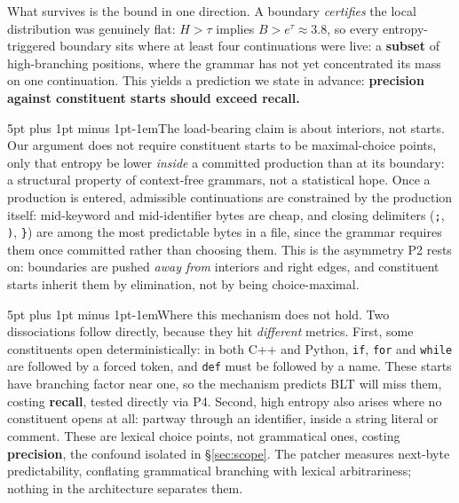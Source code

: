 \documentclass[9pt]{extarticle}
\makeatletter
\renewcommand\paragraph{\@startsection{paragraph}{4}{0pt}%
  {5pt plus 1pt minus 1pt}{-1em}{\normalfont\normalsize\bfseries}}
\newcommand{\code}[1]{\texttt{\small #1}}
\makeatother
\begin{document}
What survives is the bound in one direction. A boundary \emph{certifies} the
local distribution was genuinely flat: $H > \tau$ implies $B > e^{\tau} \approx
3.8$, so every entropy-triggered boundary sits where at least four
continuations were live: a \textbf{subset} of high-branching positions,
where the grammar has not yet concentrated its mass on one continuation. This
yields a prediction we state in advance: \textbf{precision against constituent
starts should exceed recall.}

\paragraph{The load-bearing claim is about interiors, not starts.}
Our argument does not require constituent starts to be maximal-choice points,
only that entropy be lower \emph{inside} a committed production than at its
boundary: a structural property of context-free grammars, not a statistical
hope. Once a production is entered, admissible continuations are constrained by
the production itself: mid-keyword and mid-identifier bytes are cheap, and
closing delimiters (\code{;}, \code{)}, \code{\}}) are among the most
predictable bytes in a file, since the grammar requires them once committed
rather than choosing them. This is the asymmetry P2 rests on: boundaries are
pushed \emph{away from} interiors and right edges, and constituent starts
inherit them by elimination, not by being choice-maximal.

\paragraph{Where this mechanism does not hold.}
Two dissociations follow directly, because they hit \emph{different} metrics.
First, some constituents open deterministically: in both C++ and Python,
\code{if}, \code{for} and \code{while} are followed by a forced token, and
\code{def} must be followed by a name. These starts have branching factor near
one, so the mechanism predicts BLT will miss them, costing \textbf{recall},
tested directly via P4. Second, high entropy also arises where no constituent
opens at all: partway through an identifier, inside a string literal or
comment. These are lexical choice points, not grammatical ones, costing
\textbf{precision}, the confound isolated in \S\ref{sec:scope}. The patcher
measures next-byte predictability, conflating grammatical branching with
lexical arbitrariness; nothing in the architecture separates them.
\end{document}

